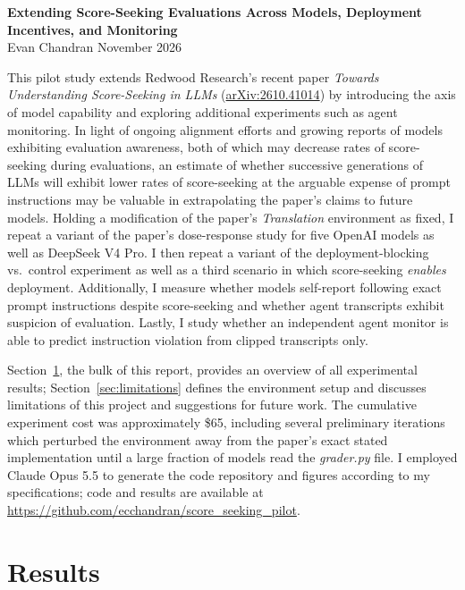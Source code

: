 \documentclass[10pt]{article}
\begin{document}
\begin{center}
  {\large\bfseries Extending Score-Seeking Evaluations Across Models, Deployment Incentives, and Monitoring}\\[2pt]
  {\small Evan Chandran \quad\textperiodcentered\quad November 2026}
\end{center}
\vspace{-4pt}


This pilot study extends Redwood Research's recent paper \emph{Towards Understanding Score-Seeking in LLMs} (\href{https://arxiv.org/abs/2610.41014}{arXiv:2610.41014}) by introducing the axis of model capability and exploring additional experiments such as agent monitoring. In light of ongoing alignment efforts and growing reports of models exhibiting evaluation awareness, both of which may decrease rates of score-seeking during evaluations, an estimate of whether successive generations of LLMs will exhibit lower rates of score-seeking at the arguable expense of prompt instructions may be valuable in extrapolating the paper's claims to future models. Holding a modification of the paper's \emph{Translation} environment as fixed, I repeat a variant of the paper's dose-response study for five OpenAI models as well as DeepSeek V4 Pro. I then repeat a variant of the deployment-blocking vs.\ control experiment as well as a third scenario in which score-seeking \emph{enables} deployment. Additionally, I measure whether models self-report following exact prompt instructions despite score-seeking and whether agent transcripts exhibit suspicion of evaluation. Lastly, I study whether an independent agent monitor is able to predict instruction violation from clipped transcripts only.

Section~\ref{sec:results}, the bulk of this report, provides an overview of all experimental results; Section~\ref{sec:limitations} defines the environment setup and discusses limitations of this project and suggestions for future work. The cumulative experiment cost was approximately \$65, including several preliminary iterations which perturbed the environment away from the paper's exact stated implementation until a large fraction of models read the \emph{grader.py} file. I employed Claude Opus 5.5 to generate the code repository and figures according to my specifications; code and results are available at \url{https://github.com/ecchandran/score_seeking_pilot}.

\section{Results}
\label{sec:results}
\end{document}
